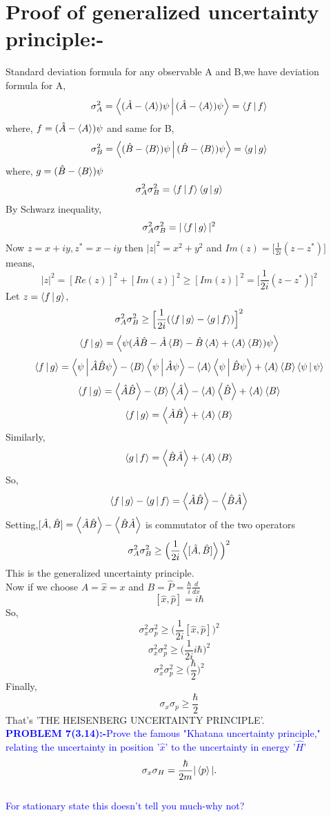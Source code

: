 \section{Proof of generalized uncertainty principle:-}
\hspace*{10cm} Standard deviation formula for any observable A and B,we have deviation formula for A, $${\sigma}_{A}^{2}=\Braket{(\hat{A}-\Braket{A})\psi|(\hat{A}-\Braket{A})\psi}=\Braket{f|f}$$
where, $f=(\hat{A}-\Braket{A})\psi$ 
and same for B,$${\sigma}_{B}^{2}=\Braket{(\hat{B}-\Braket{B})\psi|(\hat{B}-\Braket{B})\psi}=\Braket{g|g}$$
where, $g=(\hat{B}-\Braket{B})\psi$ 
 $${\sigma}_{A}^{2}{\sigma}_{B}^{2}=\Braket{f|f}\Braket{g|g}$$
 By Schwarz inequality, $${\sigma}_{A}^{2}{\sigma}_{B}^{2}=|\Braket{f|g}|^2$$
 Now $z=x+iy,z^{*}=x-iy$ then $|z|^2=x^2+y^2$ and $Im(z)=\Big[\frac{1}{2i}(z-z^{*})\Big]$\\
 means,$$|z|^2=[Re(z)]^2+[Im(z)]^2\geq [Im(z)]^2=\Big[\frac{1}{2i}(z-z^{*})\Big]^2$$
 Let $z=\Braket{f|g}$,$${\sigma}_{A}^{2}{\sigma}_{B}^{2}\geq \Big[\frac{1}{2i}(\Braket{f|g}-\Braket{g|f})\Big]^2$$
 $$\Braket{f|g}=\Braket{\psi(\hat{A}\hat{B}-\hat{A}\Braket{B}-\hat{B}\Braket{A}+\Braket{A}\Braket{B})\psi}$$
  $$\Braket{f|g}=\Braket{\psi|\hat{A}\hat{B}\psi}-\Braket{B}\Braket{\psi|\hat{A}\psi}-\Braket{A}\Braket{\psi|\hat{B}\psi}+\Braket{A}\Braket{B}\Braket{\psi|\psi}$$
   $$\Braket{f|g}=\Braket{\hat{A}\hat{B}}-\Braket{B}\Braket{\hat{A}}-\Braket{A}\Braket{\hat{B}}+\Braket{A}\Braket{B}$$
      $$\Braket{f|g}=\Braket{\hat{A}\hat{B}}+\Braket{A}\Braket{B}$$
      Similarly,$$\Braket{g|f}=\Braket{\hat{B}\hat{A}}+\Braket{A}\Braket{B}$$
      So,$$\Braket{f|g}-\Braket{g|f}=\Braket{\hat{A}\hat{B}}-\Braket{\hat{B}\hat{A}}$$
      Setting,$[\hat{A},\hat{B}]=\Braket{\hat{A}\hat{B}}-\Braket{\hat{B}\hat{A}}$ is commutator of the two operators\\
     $${\sigma}_{A}^{2}{\sigma}_{B}^{2}\geq \Big(\frac{1}{2i}\Braket{[\hat{A},\hat{B}]}\Big)^2$$
     This is the generalized uncertainty principle.\\
     Now if we choose $A=\hat{x}=x$ and $B=\hat{P}=\frac{\hbar}{i}\frac{d}{dx}$
     $$[\hat{x},\hat{p}]=i\hbar$$
     So,$${\sigma}_{x}^{2}{\sigma}_{p}^{2}\geq \Big(\frac{1}{2i}[\hat{x},\hat{p}]\Big)^2$$
     $${\sigma}_{x}^{2}{\sigma}_{p}^{2}\geq \Big(\frac{1}{2i}{i\hbar}\Big)^2$$
      $${\sigma}_{x}^{2}{\sigma}_{p}^{2}\geq \Big(\frac{\hbar}{2}\Big)^2$$
      Finally,$${\sigma}_{x}{\sigma}_{p}\geq \frac{\hbar}{2}$$
      That's 'THE HEISENBERG UNCERTAINTY PRINCIPLE'.\\
  \textcolor{blue}{ \textbf{PROBLEM 7(3.14):-}Prove the famous "Khatana uncertainty principle," relating the uncertainty in position '$\hat{x}$' to the uncertainty in energy '$\hat{H}$' $$\sigma_{x}\sigma_{H}=\frac{\hbar}{2m}|\Braket{p}|.$$\\
  For stationary state this doesn't tell you much-why not?}\\
